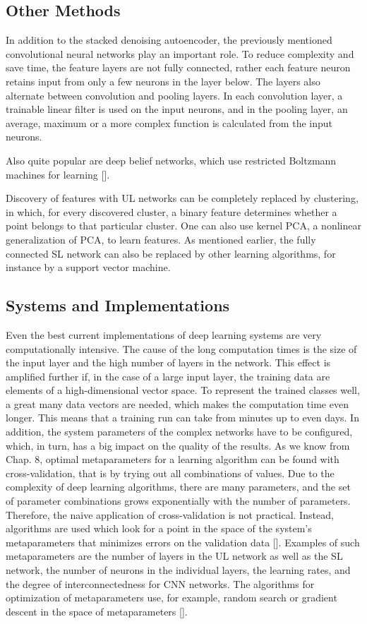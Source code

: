 \documentclass[10pt]{book}
\begin{document}
\subsection{Other Methods}
In addition to the stacked denoising autoencoder, the previously mentioned convolutional neural networks play an important role. To reduce complexity and save time, the feature layers are not fully connected, rather each feature neuron retains input from only a few neurons in the layer below. The layers also alternate between convolution and pooling layers. In each convolution layer, a trainable linear filter is used on the input neurons, and in the pooling layer, an average, maximum or a more complex function is calculated from the input neurons.

Also quite popular are deep belief networks, which use restricted Boltzmann machines for learning [\cite{hinton2006dbn}].

Discovery of features with UL networks can be completely replaced by clustering, in which, for every discovered cluster, a binary feature determines whether a point belongs to that particular cluster. One can also use kernel PCA, a nonlinear generalization of PCA, to learn features. As mentioned earlier, the fully connected SL network can also be replaced by other learning algorithms, for instance by a support vector machine.

\subsection{Systems and Implementations}
Even the best current implementations of deep learning systems are very computationally intensive. The cause of the long computation times is the size of the input layer and the high number of layers in the network. This effect is amplified further if, in the case of a large input layer, the training data are elements of a high-dimensional vector space. To represent the trained classes well, a great many data vectors are needed, which makes the computation time even longer.
This means that a training run can take from minutes up to even days. In addition, the system parameters of the complex networks have to be configured, which, in turn, has a big impact on the quality of the results. As we know from Chap. 8, optimal metaparameters for a learning algorithm can be found with cross-validation, that is by trying out all combinations of values. Due to the complexity of deep learning algorithms, there are many parameters, and the set of parameter combinations grows exponentially with the number of parameters. Therefore, the naive application of cross-validation is not practical. Instead, algorithms are used which look for a point in the space of the system's metaparameters that minimizes errors on the validation data [\cite{bergstra2011algorithms}]. Examples of such metaparameters are the number of layers in the UL network as well as the SL network, the number of neurons in the individual layers, the learning rates, and the degree of interconnectedness for CNN networks. The algorithms for optimization of metaparameters use, for example, random search or gradient descent in the space of metaparameters [\cite{maclaurin2015reversible}].
\end{document}

